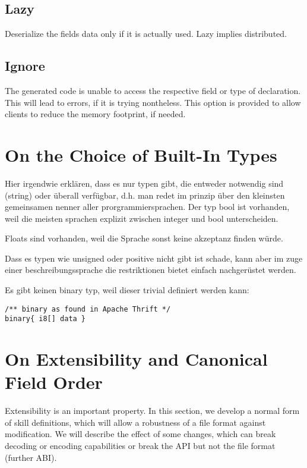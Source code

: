 \documentclass[a4paper,10pt]{article}
\begin{document}
\subsection*{Lazy}
Deserialize the fields data only if it is actually used. Lazy implies distributed.

\subsection*{Ignore}
The generated code is unable to access the respective field or type of declaration. This will lead to errors, if it is trying nontheless. This option is provided to allow clients to reduce the memory footprint, if needed.

\section{On the Choice of Built-In Types}

Hier irgendwie erklären, dass es nur typen gibt, die entweder notwendig sind (string) oder überall verfügbar, d.h. man redet im prinzip über den kleinsten gemeinsamen nenner aller prorgrammiersprachen. Der typ bool ist vorhanden, weil die meisten sprachen explizit zwischen integer und bool unterscheiden.

Floats sind vorhanden, weil die Sprache sonst keine akzeptanz finden würde.

Dass es typen wie unsigned oder positive nicht gibt ist schade, kann aber im zuge einer beschreibungssprache die restriktionen bietet einfach nachgerüstet werden.

Es gibt keinen binary typ, weil dieser trivial definiert werden kann:
\begin{lstlisting}[label=thriftBinary,caption=Binary,language=skill]
/** binary as found in Apache Thrift */
binary{ i8[] data }
\end{lstlisting}


\section{On Extensibility and Canonical Field Order}

Extensibility is an important property. In this section, we develop a normal form of skill definitions, which will allow a robustness of a file format against modification. We will describe the effect of some changes, which can break decoding or encoding capabilities or break the API but not the file format (further ABI).
\end{document}
